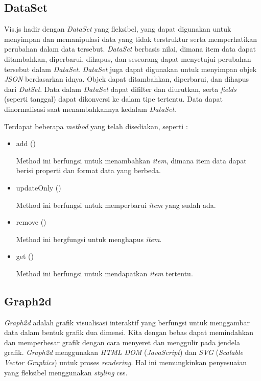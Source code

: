 \subsection{DataSet}
Vis.js hadir dengan \textit{DataSet} yang fleksibel, yang dapat digunakan untuk menyimpan dan memanipulasi data yang tidak terstruktur serta memperhatikan perubahan dalam data tersebut. \textit{DataSet} berbasis nilai, dimana item data dapat ditambahkan, diperbarui, dihapus, dan seseorang dapat menyetujui perubahan tersebut dalam \textit{DataSet}. \textit{DataSet} juga dapat digunakan untuk menyimpan objek \textit{JSON} berdasarkan idnya. Objek dapat ditambahkan, diperbarui, dan dihapus dari \textit{DatSet}. Data dalam \textit{DataSet} dapat difilter dan diurutkan, serta \textit{fields} (seperti tanggal) dapat dikonversi ke dalam tipe tertentu. Data dapat dinormalisasi saat menambahkannya kedalam \textit{DataSet}. \cite{dataset}

Terdapat beberapa \textit{method} yang telah disediakan, seperti :
\begin{itemize}
    \item add ()
    
    Method ini berfungsi untuk menambahkan \textit{item}, dimana item data dapat berisi properti dan format data yang berbeda.
    \item updateOnly ()
    
    Method ini berfungsi untuk memperbarui \textit{item} yang sudah ada.
    \item remove ()
    
    Method ini bergfungsi untuk menghapus \textit{item}.
    \item get ()
    
    Method ini berfungsi untuk mendapatkan \textit{item} tertentu.
\end{itemize}

\subsection{Graph2d}
\textit{Graph2d} adalah grafik visualisasi interaktif yang berfungsi untuk menggambar data dalam bentuk grafik dua dimensi. Kita dengan bebas dapat memindahkan dan memperbesar grafik dengan cara menyeret dan menggulir pada jendela grafik. \textit{Graph2d} menggunakan \textit{HTML DOM} (\textit{JavaScript}) dan \textit{SVG} (\textit{Scalable Vector Graphics}) untuk proses \textit{rendering}. Hal ini memungkinkan penyesuaian yang fleksibel menggunakan \textit{styling} css. \cite{graph2d}

